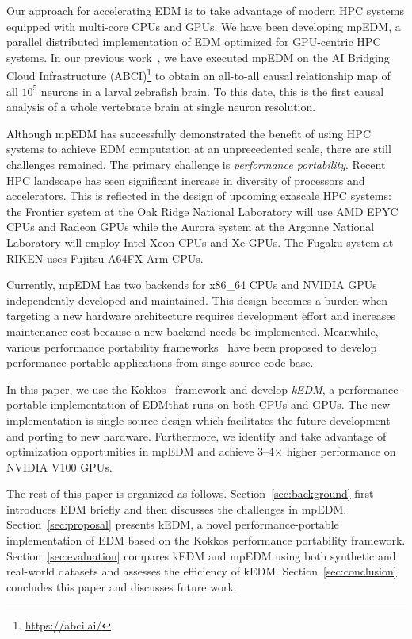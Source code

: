 \documentclass[sigconf]{acmart}
\begin{document}
Our approach for accelerating EDM is to take advantage of modern HPC systems
equipped with multi-core CPUs and GPUs. We have been developing mpEDM, a
parallel distributed implementation of EDM optimized for GPU-centric HPC
systems. In our previous work~\cite{mpedm}, we have executed mpEDM on
the AI Bridging Cloud Infrastructure (ABCI)\footnote{\url{https://abci.ai/}}
to obtain an all-to-all causal relationship map of all $10^5$ neurons in a
larval zebrafish brain. To this date, this is the first causal analysis of a
whole vertebrate brain at single neuron resolution.

Although mpEDM has successfully demonstrated the benefit of using HPC systems
to achieve EDM computation at an unprecedented scale, there are still
challenges remained. The primary challenge is \textit{performance portability}.
Recent HPC landscape has seen significant increase in diversity of processors
and accelerators. This is reflected in the design of upcoming exascale HPC
systems: the Frontier system at the Oak Ridge National Laboratory will use AMD
EPYC CPUs and Radeon GPUs while the Aurora system at the Argonne National
Laboratory will employ Intel Xeon CPUs and Xe GPUs. The Fugaku system at RIKEN
uses Fujitsu A64FX Arm CPUs.

Currently, mpEDM has two backends for x86\_64 CPUs and NVIDIA GPUs
independently developed and maintained. This design becomes a burden when
targeting a new hardware architecture requires development effort and
increases maintenance cost because a new backend needs be implemented.
Meanwhile, various performance portability frameworks~\cite{Deakin2019,
Deakin2020} have been proposed to develop performance-portable applications
from singe-source code base.

In this paper, we use the Kokkos~\cite{Edwards2014} framework and develop
\textit{kEDM}, a performance-portable implementation of EDM\@ that runs on
both CPUs and GPUs. The new implementation is single-source design which
facilitates the future development and porting to new hardware. Furthermore,
we identify and take advantage of optimization opportunities in mpEDM and
achieve 3--4$\times$ higher performance on NVIDIA V100 GPUs.

The rest of this paper is organized as follows. Section~\ref{sec:background}
first introduces EDM briefly and then discusses the challenges in mpEDM\@.
Section~\ref{sec:proposal} presents kEDM, a novel performance-portable
implementation of EDM based on the Kokkos performance portability framework.
Section~\ref{sec:evaluation} compares kEDM and mpEDM using both synthetic and
real-world datasets and assesses the efficiency of kEDM\@.
Section~\ref{sec:conclusion} concludes this paper and discusses future work.
\end{document}
